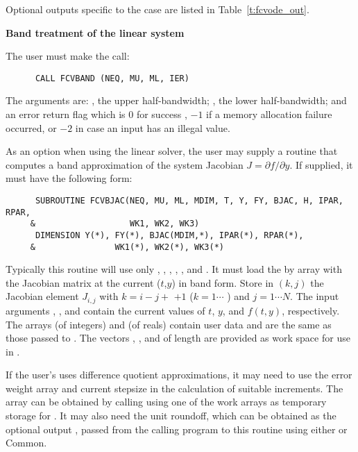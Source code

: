 \begin{Steps}
  Optional outputs specific to the {\dense} case are listed in
  Table~\ref{t:fcvode_out}.


  {\s} {\bf Band treatment of the linear system}
  
  The user must make the call:
\begin{verbatim}
      CALL FCVBAND (NEQ, MU, ML, IER)
\end{verbatim}
  The arguments are: , the upper half-bandwidth; , 
  the lower half-bandwidth; and  an error return flag which is 
  $0$ for success , $-1$ if a memory allocation failure occurred, or $-2$ 
  in case an input has an illegal value.     
  
  As an option when using the {\band} linear solver, the user may supply a
  routine that computes a band approximation of the system Jacobian 
  $J = \partial f / \partial y$. If supplied, it must have the following form:
\begin{verbatim}
      SUBROUTINE FCVBJAC(NEQ, MU, ML, MDIM, T, Y, FY, BJAC, H, IPAR, RPAR,
     &                   WK1, WK2, WK3)
      DIMENSION Y(*), FY(*), BJAC(MDIM,*), IPAR(*), RPAR(*),
     &                WK1(*), WK2(*), WK3(*)
\end{verbatim}
  Typically this routine will use only , , , , 
  , and .
  It must load the  by  array  with the Jacobian matrix
  at the current ($t$,$y$) in band form.  Store in $(k,j)$ the Jacobian
  element $J_{i,j}$ with $k = i - j + $  $ + 1$ ($k = 1 \cdots $
  ) and $j = 1 \cdots N$.
  The input arguments , , and  contain the current
  values of $t$, $y$, and $f(t,y)$, respectively.
  The arrays  (of integers) and  (of reals) contain user data
  and are the same as those passed to .
  The vectors , ,
  and  of length  are provided as work space for use in
  .

  If the user's  uses difference quotient approximations, it
  may need to use the error weight array  and current stepsize 
  in the calculation of suitable increments.  The array  can be
  obtained by calling  using one of the work arrays as
  temporary storage for .  It may also need the unit roundoff,
  which can be obtained as the optional output , passed from
  the calling program to this routine using either  or Common.


\end{Steps}
